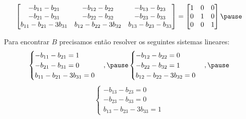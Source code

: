 \documentclass{beamer}
\begin{document}
    \begin{frame}
        \[
        \begin{bmatrix}
            -b_{11} - b_{21} & -b_{12} - b_{22} & -b_{13} - b_{23}\\
            -b_{21} - b_{31} & -b_{22} - b_{32} & -b_{23} - b_{33}\\
            b_{11} - b_{21} - 3b_{31} & b_{12} - b_{22} - 3b_{32} & b_{13} - b_{23} - b_{33}
        \end{bmatrix} = \begin{bmatrix}
            1 & 0 & 0\\0 & 1 & 0\\0 & 0 & 1
        \end{bmatrix}\pause
        \]

        Para encontrar $B$ precisamos então resolver os seguintes sistemas lineares:\pause
        \[
        \begin{cases}
            -b_{11} - b_{21} = 1\\
            -b_{21} - b_{31} = 0\\
            b_{11} - b_{21} - 3b_{31} = 0
        \end{cases},\pause
        \begin{cases}
            -b_{12} - b_{22} = 0\\
            -b_{22} - b_{32} = 1\\
            b_{12} - b_{22} - 3b_{32} = 0
        \end{cases},\pause
        \]
        \[
        \begin{cases}
            -b_{13} - b_{23} = 0\\
            -b_{23} - b_{33} = 0\\
            b_{13} - b_{23} - 3b_{33} = 1
        \end{cases}
        \]
    \end{frame}
\end{document}
